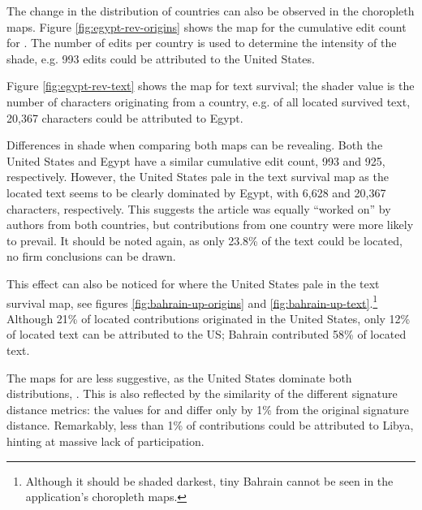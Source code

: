 The change in the distribution of countries can also be observed in the choropleth maps. 
Figure \ref{fig:egypt-rev-origins} shows the map for the cumulative edit count for .
The number of edits per country is used to determine the intensity of the shade, e.g. 993 edits could be attributed to the United States. 

Figure \ref{fig:egypt-rev-text} shows the map for text survival; the shader value is the number of characters originating from a country, e.g. of all located survived text, 20,367 characters could be attributed to Egypt.

Differences in shade when comparing both maps can be revealing.
Both the United States and Egypt have a similar cumulative edit count, 993 and 925, respectively.
However, the United States pale in the text survival map as the located text seems to be clearly dominated by Egypt, with 6,628 and 20,367 characters, respectively.
This suggests the article was equally ``worked on'' by authors from both countries, but contributions from one country were more likely to prevail.
It should be noted again, as only 23.8\% of the text could be located, no firm conclusions can be drawn.



This effect can also be noticed for  where the United States pale in the text survival map, see figures \ref{fig:bahrain-up-origins} and \ref{fig:bahrain-up-text}.\footnote{Although it should be shaded darkest, tiny Bahrain cannot be seen in the application's choropleth maps.}
Although 21\% of located contributions originated in the United States, only 12\% of located text can be attributed to the US; Bahrain contributed 58\% of located text.

The maps for  are less suggestive, as the United States dominate both distributions, .
This is also reflected by the similarity of the different signature distance metrics: the values for  and  differ only by 1\% from the original signature distance.
Remarkably, less than 1\% of contributions could be attributed to Libya, hinting at massive lack of participation.


